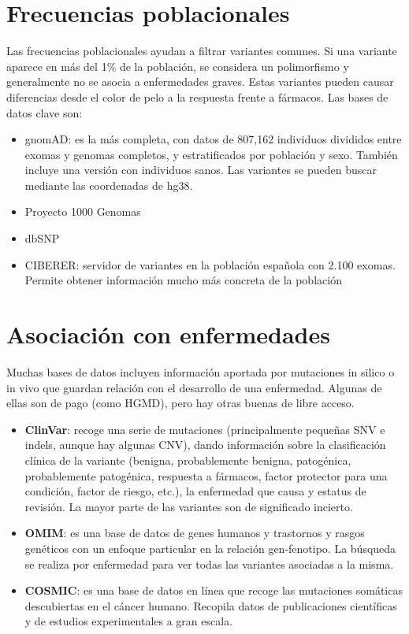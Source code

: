 \section{Frecuencias poblacionales}
Las frecuencias poblacionales ayudan a filtrar variantes comunes. Si una variante aparece en más del 1\% de la población, se considera un polimorfismo y generalmente no se asocia a enfermedades graves. Estas variantes pueden causar diferencias desde el color de pelo a la respuesta frente a fármacos. Las bases de datos clave son:
\begin{itemize}
\item gnomAD: es la más completa, con datos de 807,162 individuos divididos entre exomas y genomas completos, y estratificados por población y sexo. También incluye una versión con individuos sanos. Las variantes se pueden buscar mediante las coordenadas de hg38.
\item Proyecto 1000 Genomas
\item dbSNP
\item CIBERER: servidor de variantes en la población española con 2.100 exomas. Permite obtener información mucho más concreta de la población
\end{itemize}

\section{Asociación con enfermedades}
Muchas bases de datos incluyen información aportada por mutaciones in silico o in vivo que guardan relación con el desarrollo de una enfermedad. Algunas de ellas son de pago (como HGMD), pero hay otras buenas de libre acceso.
\begin{itemize}
\item \textbf{ClinVar}: recoge una serie de mutaciones (principalmente pequeñas SNV e indels, aunque hay algunas CNV), dando información sobre la clasificación clínica de la variante (benigna, probablemente benigna, patogénica, probablemente patogénica, respuesta a fármacos, factor protector para una condición, factor de riesgo, etc.), la enfermedad que causa y estatus de revisión. La mayor parte de las variantes son de significado incierto.
\item \textbf{OMIM}: es una base de datos de genes humanos y trastornos y rasgos genéticos con un enfoque particular en la relación gen-fenotipo. La búsqueda se realiza por enfermedad para ver todas las variantes asociadas a la misma.
\item \textbf{COSMIC}: es una base de datos en línea que recoge las mutaciones somáticas descubiertas en el cáncer humano. Recopila datos de publicaciones científicas y de estudios experimentales a gran escala.
\end{itemize}

